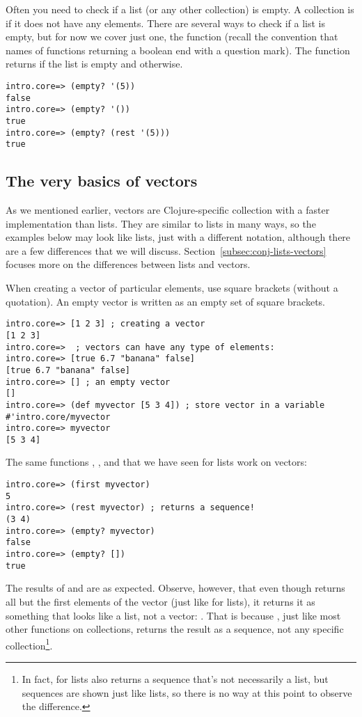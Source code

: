 Often you need to check if a list (or any other collection) is empty. A collection is  if it does not have any elements. There are several ways to check if a list is empty, but for now we cover just one, the function  (recall the convention that names of functions returning a boolean end with a question mark). The function returns  if the list is empty and  otherwise.
\begin{framed}
\begin{verbatim}
intro.core=> (empty? '(5))
false
intro.core=> (empty? '())
true
intro.core=> (empty? (rest '(5)))
true
\end{verbatim}
\end{framed}

\subsection{The very basics of vectors}\label{subsec:vectors}
As we mentioned earlier, vectors are Clojure-specific collection with a faster implementation than lists. They are similar to lists in many ways, so the examples below may look like lists, just with a different notation, although there are a few differences that we will discuss. Section~\ref{subsec:conj-lists-vectors} focuses more on the differences between lists and vectors. 

When creating a vector of particular elements, use square brackets (without a quotation). An empty vector is written as an empty set of square brackets.
\begin{framed}
\begin{verbatim}
intro.core=> [1 2 3] ; creating a vector
[1 2 3]
intro.core=>  ; vectors can have any type of elements: 
intro.core=> [true 6.7 "banana" false]
[true 6.7 "banana" false]
intro.core=> [] ; an empty vector
[]
intro.core=> (def myvector [5 3 4]) ; store vector in a variable 
#'intro.core/myvector
intro.core=> myvector
[5 3 4]
\end{verbatim}
\end{framed}
The same functions  , , and  that we have seen for lists work on vectors:

\begin{framed}
\begin{verbatim}
intro.core=> (first myvector)
5
intro.core=> (rest myvector) ; returns a sequence!
(3 4)
intro.core=> (empty? myvector)
false
intro.core=> (empty? [])
true
\end{verbatim}
\end{framed}
The results of    and    are as expected. Observe, however, that even though  returns all but the first elements of the vector (just like for lists), it returns it as something that looks like a list, not a vector: . That is because  , just like most other functions on collections, returns the result as a sequence, not any specific collection\footnote{In fact,  for lists also returns a sequence that's not necessarily a list, but sequences are shown just like lists, so there is no way at this point to observe the difference.}. 


